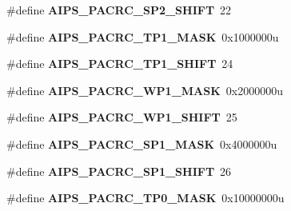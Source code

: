 \begin{DoxyCompactItemize}
\item 
\#define {\bfseries A\+I\+P\+S\+\_\+\+P\+A\+C\+R\+C\+\_\+\+S\+P2\+\_\+\+S\+H\+I\+FT}~22\hypertarget{group__AIPS__Register__Masks_gabb851888de7464c3cf7604aac54c9016}{}\label{group__AIPS__Register__Masks_gabb851888de7464c3cf7604aac54c9016}

\item 
\#define {\bfseries A\+I\+P\+S\+\_\+\+P\+A\+C\+R\+C\+\_\+\+T\+P1\+\_\+\+M\+A\+SK}~0x1000000u\hypertarget{group__AIPS__Register__Masks_ga0a1bf27c4f4edcd9c35c77d48c881cbd}{}\label{group__AIPS__Register__Masks_ga0a1bf27c4f4edcd9c35c77d48c881cbd}

\item 
\#define {\bfseries A\+I\+P\+S\+\_\+\+P\+A\+C\+R\+C\+\_\+\+T\+P1\+\_\+\+S\+H\+I\+FT}~24\hypertarget{group__AIPS__Register__Masks_gaf269ee59444a7009b58137f3049be346}{}\label{group__AIPS__Register__Masks_gaf269ee59444a7009b58137f3049be346}

\item 
\#define {\bfseries A\+I\+P\+S\+\_\+\+P\+A\+C\+R\+C\+\_\+\+W\+P1\+\_\+\+M\+A\+SK}~0x2000000u\hypertarget{group__AIPS__Register__Masks_ga4bb423c596ecb78c1e23d9954cc4fedd}{}\label{group__AIPS__Register__Masks_ga4bb423c596ecb78c1e23d9954cc4fedd}

\item 
\#define {\bfseries A\+I\+P\+S\+\_\+\+P\+A\+C\+R\+C\+\_\+\+W\+P1\+\_\+\+S\+H\+I\+FT}~25\hypertarget{group__AIPS__Register__Masks_ga48eccf183c93ef49d1ccc76ae947848d}{}\label{group__AIPS__Register__Masks_ga48eccf183c93ef49d1ccc76ae947848d}

\item 
\#define {\bfseries A\+I\+P\+S\+\_\+\+P\+A\+C\+R\+C\+\_\+\+S\+P1\+\_\+\+M\+A\+SK}~0x4000000u\hypertarget{group__AIPS__Register__Masks_ga0463369151b0ea0dbfe9046ca3f86d88}{}\label{group__AIPS__Register__Masks_ga0463369151b0ea0dbfe9046ca3f86d88}

\item 
\#define {\bfseries A\+I\+P\+S\+\_\+\+P\+A\+C\+R\+C\+\_\+\+S\+P1\+\_\+\+S\+H\+I\+FT}~26\hypertarget{group__AIPS__Register__Masks_ga98e4972b5f23d416e012c2726890e177}{}\label{group__AIPS__Register__Masks_ga98e4972b5f23d416e012c2726890e177}

\item 
\#define {\bfseries A\+I\+P\+S\+\_\+\+P\+A\+C\+R\+C\+\_\+\+T\+P0\+\_\+\+M\+A\+SK}~0x10000000u\hypertarget{group__AIPS__Register__Masks_gaee84972aa2f3c91842a560b8d4dbdf3e}{}\label{group__AIPS__Register__Masks_gaee84972aa2f3c91842a560b8d4dbdf3e}


\end{DoxyCompactItemize}
